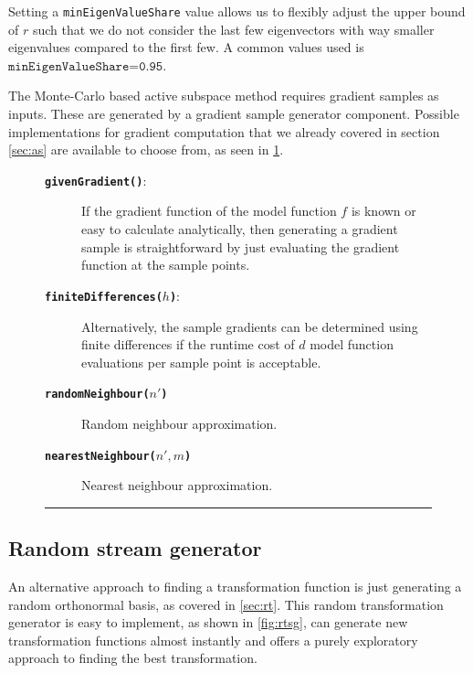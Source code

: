\documentclass[
  a4paper,  %
  twoside,  %
  bibliography=totoc,
  headsepline,
  cleardoublepage=empty,
  parskip=half,
  draft=false
]{scrbook}
\newcommand{\delimit}{{\color{silver}\noindent\rule{\textwidth}{1pt}}}
\begin{document}
Setting a \texttt{minEigenValueShare} value allows us to flexibly adjust the upper bound of $r$ such that we do not consider the last few eigenvectors with way smaller eigenvalues compared to the first few.
A common values used is $\texttt{minEigenValueShare=0.95}$.

The Monte-Carlo based active subspace method requires gradient samples as inputs.
These are generated by a gradient sample generator component.
Possible implementations for gradient computation that we already covered in section \cref{sec:as} are available to choose from, as seen in \cref{fig:gg}.


\newpage

\begin{mdframed}[style=style,frametitle={Gradient sample generator}]
\begin{figure}[H]
\begin{description}
\item[\texttt{\textbf{givenGradient()}}:] If the gradient function of the model function $f$ is known or easy to calculate analytically, then generating a gradient sample is straightforward by just evaluating the gradient function at the sample points.
\item[\texttt{\textbf{finiteDifferences($h$)}}:] Alternatively, the sample gradients can be determined using finite differences if the runtime cost of $d$ model function evaluations per sample point is acceptable.
\item[\texttt{\textbf{randomNeighbour($n'$)}}] Random neighbour approximation.
\item[\texttt{\textbf{nearestNeighbour($n', m$)}}] Nearest neighbour approximation.
\end{description}
\delimit
{}
\label{fig:gg}
\end{figure}
\end{mdframed}

\subsection {Random stream generator}
\label{sec:rtg}

An alternative approach to finding a transformation function is just generating a random orthonormal basis, as covered in \cref{sec:rt}.
This random transformation generator is easy to implement, as shown in \cref{fig:rtsg}, can generate new transformation functions almost instantly and offers a purely exploratory approach to finding the best transformation.
\end{document}

